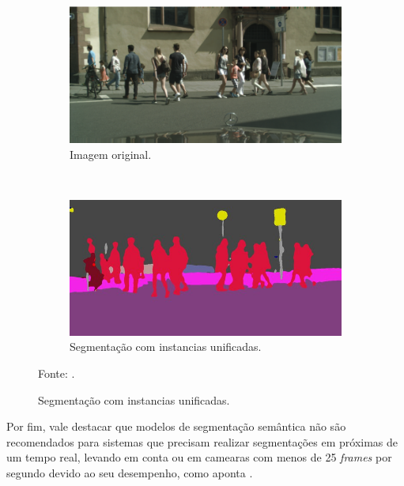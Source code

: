 \begin{figure}[H]
   \caption{Exemplo de segmentação semântica com instancias unificadas.}
   \centering
   \label{semantic:fig:4}
    \begin{subfigure}[t]{0.45\textwidth}
        \centering
        \includegraphics[width=1.3\linewidth]{recursos/imagens/semantic/sema_ori.png}
        \caption{Imagem original.}
        \label{semantic:fig:4.1}
    \end{subfigure}%
    ~ 

    \begin{subfigure}[t]{0.45\textwidth}
        \centering
        \includegraphics[width=1.3\linewidth]{recursos/imagens/semantic/sema_unified.png}
        \caption{Segmentação com instancias unificadas.}
        \label{semantic:fig:4.2}
    \end{subfigure}%

    \vspace*{1 cm}
    Fonte: \cite{Fischer2017AdversarialSegmentation}.
\end{figure}

Por fim, vale destacar que modelos de segmentação semântica não são recomendados para sistemas que precisam realizar segmentações em próximas de um tempo real, levando em conta ou em camearas com menos de 25 \textit{frames} por segundo devido ao seu desempenho, como aponta \cite{Minaee2021}.